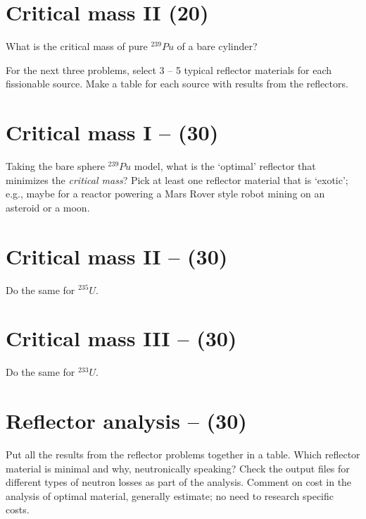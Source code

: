 \documentclass[11pt,a4paper]{article}
\begin{document}
\newpage

\section{Critical mass II (20)}
What is the critical mass of pure $^{239}Pu$ of a bare cylinder?





\newpage

For the next three problems, select 3 -- 5 typical reflector materials for each fissionable source. Make a table for each source with results from the reflectors.

\newpage

\section{Critical mass I -- (30)}
Taking the bare sphere $^{239}Pu$ model, what is the `optimal' reflector that minimizes the \textit{critical mass}? Pick at least one reflector material that is `exotic'; e.g., maybe for a reactor powering a Mars Rover style robot mining on an asteroid or a moon.  





\newpage

\section{Critical mass II -- (30)}
Do the same for $^{235}U$.





\newpage

\section{Critical mass III -- (30)}
Do the same for $^{233}U$.





\newpage

\section{Reflector analysis -- (30)}
Put all the results from the reflector problems together in a table. Which reflector material is minimal and why, neutronically speaking? Check the output files for different types of neutron losses as part of the analysis. Comment on cost in the analysis of optimal material, generally estimate; no need to research specific costs.
\end{document}
